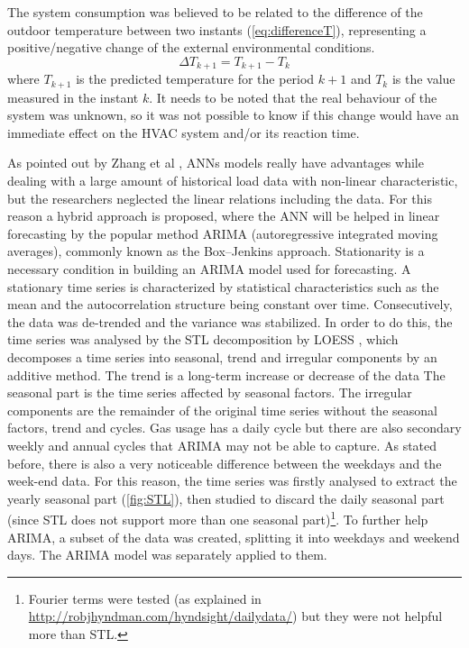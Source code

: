 \documentclass{sig-alternate-sigmod07}
\begin{document}
The system consumption was believed to be related to the difference of the outdoor temperature between two instants (\cref{eq:differenceT}), representing a positive/negative change of the external environmental conditions.
\begin{equation}\Delta T_{k+1}=T_{k+1} - T_{k}\label{eq:differenceT}\end{equation} where $T_{k+1}$ is the predicted temperature for the period $k+1$ and $T_k$ is the value measured in the instant $k$. It needs to be noted that the real behaviour of the system was unknown, so it was not possible to know if this change would have an immediate effect on the HVAC system and/or its reaction time.

As pointed out by Zhang et al \cite{zhang1998forecasting}, ANNs models really have advantages while dealing with a large amount of historical load data with non-linear characteristic, but the researchers neglected the linear relations including the data. For this reason a hybrid approach is proposed, where the ANN will be helped in linear forecasting by the popular method ARIMA (autoregressive integrated moving averages), commonly known as the Box–Jenkins approach. 
Stationarity is a necessary condition in building an ARIMA model used for forecasting. A stationary time series is characterized by statistical characteristics such as the mean and the autocorrelation structure being constant over
time. Consecutively, the data was de-trended and the variance was stabilized. 
In order to do this, the time series was analysed by the STL decomposition by LOESS \cite{cleveland1990stl}, which decomposes a time series into seasonal, trend and irregular components by an additive method. The trend is a long-term increase or decrease of the data The seasonal part is the time series affected by seasonal factors. The irregular components are the remainder of the original time series without the seasonal factors, trend and cycles. 
Gas usage has a daily cycle but there are also secondary weekly and annual cycles that ARIMA may not be able to capture. As stated before, there is also a very noticeable difference between the weekdays and the week-end data. For this reason, the time series was firstly analysed to extract the yearly seasonal part (\cref{fig:STL}), then studied to discard the daily seasonal part (since STL does not support more than one seasonal part)\footnote{Fourier terms were tested (as explained in \url{http://robjhyndman.com/hyndsight/dailydata/}) but they were not helpful more than STL.}. To further help ARIMA, a subset of the data was created, splitting it into weekdays and weekend days. The ARIMA model was separately applied to them. 
\end{document}
